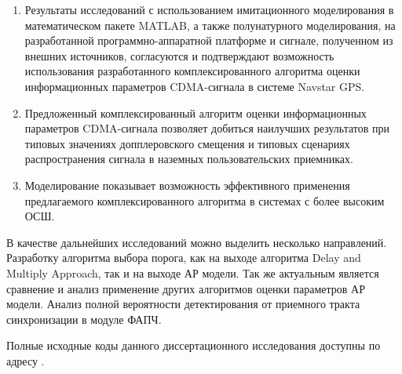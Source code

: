 \begin{enumerate}
	\item Результаты исследований с использованием имитационного моделирования в математическом пакете MATLAB, а также полунатурного моделирования,
		на разработанной программно-аппаратной платформе и сигнале, полученном из внешних источников, согласуются и подтверждают возможность
		использования разработанного комплексированного алгоритма оценки информационных параметров CDMA-сигнала в системе Navstar GPS.
	\item Предложенный комплексированный алгоритм оценки информационных параметров CDMA-сигнала позволяет добиться наилучших результатов при
		типовых значениях допплеровского смещения и типовых сценариях распространения сигнала в наземных пользовательских приемниках.
	\item Моделирование показывает возможность эффективного применения предлагаемого комплексированного алгоритма в системах с более высоким ОСШ.
\end{enumerate}

В качестве дальнейших исследований можно выделить несколько направлений. Разработку алгоритма выбора порога, как на выходе алгоритма Delay and Multiply Approach,
так и на выходе АР модели. Так же актуальным является сравнение и анализ применение других алгоритмов оценки параметров АР модели. Анализ полной вероятности
детектирования от приемного тракта синхронизации в модуле ФАПЧ.

Полные исходные коды данного диссертационного исследования доступны по адресу \cite{phdSRC}.

\clearpage
